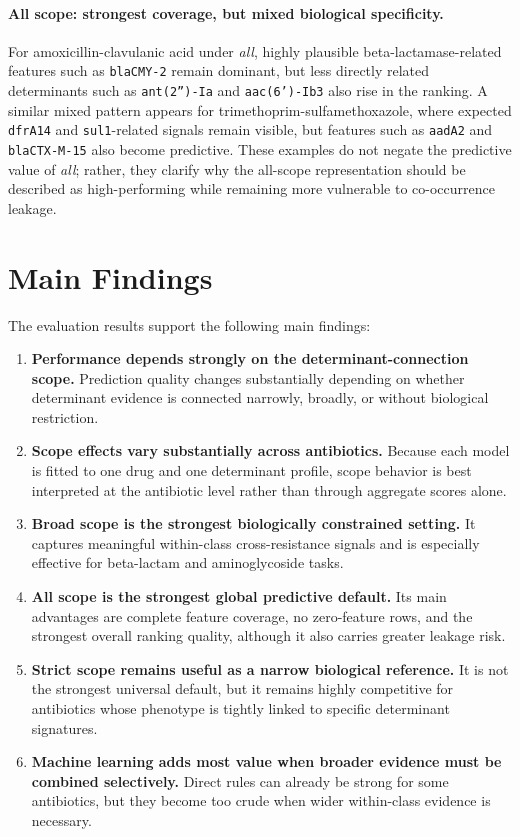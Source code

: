 \paragraph{All scope: strongest coverage, but mixed biological specificity.}
For amoxicillin-clavulanic acid under \textit{all}, highly plausible beta-lactamase-related features such as \texttt{blaCMY-2} remain dominant, but less directly related determinants such as \texttt{ant(2'')-Ia} and \texttt{aac(6')-Ib3} also rise in the ranking. A similar mixed pattern appears for trimethoprim-sulfamethoxazole, where expected \texttt{dfrA14} and \texttt{sul1}-related signals remain visible, but features such as \texttt{aadA2} and \texttt{blaCTX-M-15} also become predictive. These examples do not negate the predictive value of \textit{all}; rather, they clarify why the all-scope representation should be described as high-performing while remaining more vulnerable to co-occurrence leakage.

\section{Main Findings}

The evaluation results support the following main findings:
\begin{enumerate}[label=\arabic*.]
    \item \textbf{Performance depends strongly on the determinant-connection scope.} Prediction quality changes substantially depending on whether determinant evidence is connected narrowly, broadly, or without biological restriction.
    \item \textbf{Scope effects vary substantially across antibiotics.} Because each model is fitted to one drug and one determinant profile, scope behavior is best interpreted at the antibiotic level rather than through aggregate scores alone.
    \item \textbf{Broad scope is the strongest biologically constrained setting.} It captures meaningful within-class cross-resistance signals and is especially effective for beta-lactam and aminoglycoside tasks.
    \item \textbf{All scope is the strongest global predictive default.} Its main advantages are complete feature coverage, no zero-feature rows, and the strongest overall ranking quality, although it also carries greater leakage risk.
    \item \textbf{Strict scope remains useful as a narrow biological reference.} It is not the strongest universal default, but it remains highly competitive for antibiotics whose phenotype is tightly linked to specific determinant signatures.
    \item \textbf{Machine learning adds most value when broader evidence must be combined selectively.} Direct rules can already be strong for some antibiotics, but they become too crude when wider within-class evidence is necessary.
\end{enumerate}

